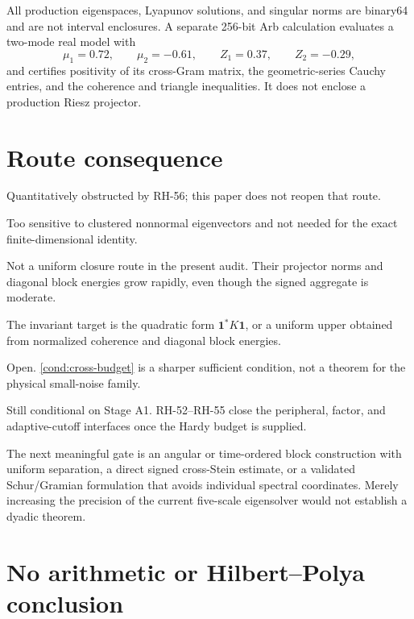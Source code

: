 \documentclass[11pt]{article}
\theoremstyle{remark}
\begin{document}
All production eigenspaces, Lyapunov solutions, and singular norms are
binary64 and are not interval enclosures.  A separate 256-bit Arb calculation
evaluates a two-mode real model with
\[
 \mu_1=0.72,\qquad \mu_2=-0.61,\qquad Z_1=0.37,\qquad Z_2=-0.29,
\]
and certifies positivity of its cross-Gram matrix, the geometric-series
Cauchy entries, and the coherence and triangle inequalities.  It does not
enclose a production Riesz projector.

\section{Route consequence}
\label{sec:consequence}

\begin{description}[leftmargin=4.7cm,style=nextline]
 \item[Global strong-space black box]
 Quantitatively obstructed by RH-56; this paper does not reopen that route.
 \item[Individual modal absolute overlaps]
 Too sensitive to clustered nonnormal eigenvectors and not needed for the
 exact finite-dimensional identity.
 \item[Fixed radial Riesz blocks]
 Not a uniform closure route in the present audit.  Their projector norms and
 diagonal block energies grow rapidly, even though the signed aggregate is
 moderate.
 \item[Cross-Stein aggregate]
 The invariant target is the quadratic form $\mathbf 1^*K\mathbf 1$, or a
 uniform upper obtained from normalized coherence and diagonal block energies.
 \item[Stage A1]
 Open.  \cref{cond:cross-budget} is a sharper sufficient condition, not a
 theorem for the physical small-noise family.
 \item[Stage A4 intrinsic identification]
 Still conditional on Stage A1.  RH-52--RH-55 close the peripheral, factor,
 and adaptive-cutoff interfaces once the Hardy budget is supplied.
\end{description}

The next meaningful gate is an angular or time-ordered block construction
with uniform separation, a direct signed cross-Stein estimate, or a validated
Schur/Gramian formulation that avoids individual spectral coordinates.  Merely
increasing the precision of the current five-scale eigensolver would not
establish a dyadic theorem.

\section{No arithmetic or Hilbert--Polya conclusion}
\end{document}
